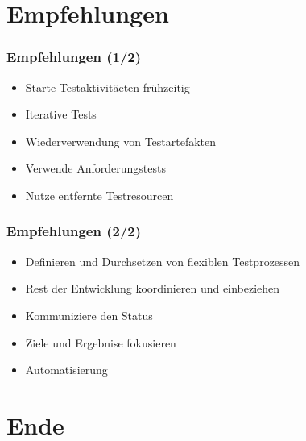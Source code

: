 \section{Empfehlungen}
\begin{frame}
	\frametitle{Empfehlungen (1/2)}
	\begin{itemize}
		\item Starte Testaktivit\"aeten fr\"uhzeitig
		\item Iterative Tests
		\item Wiederverwendung von Testartefakten
		\item Verwende Anforderungstests
		\item Nutze entfernte Testresourcen
	\end{itemize}
\end{frame}

\begin{frame}
	\frametitle{Empfehlungen (2/2)}
	\begin{itemize}
		\item Definieren und Durchsetzen von flexiblen Testprozessen
		\item Rest der Entwicklung koordinieren und einbeziehen
		\item Kommuniziere den Status
		\item Ziele und Ergebnise fokusieren
		\item Automatisierung
	\end{itemize}
\end{frame}

\section{Ende}
\begin{frame}
\end{frame}